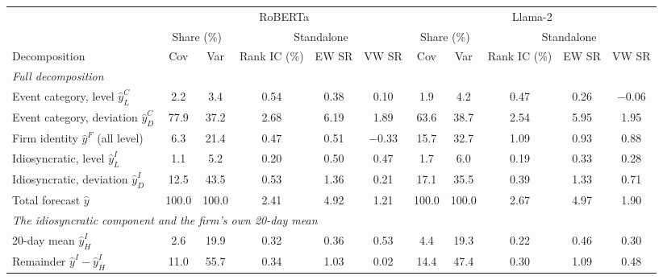 \begin{table}[htbp]
{\footnotesize
\begin{adjustbox}{max width=\linewidth, max totalheight=0.75\textheight}
\begin{tabular}{lcccccccccc}
\toprule
 & \multicolumn{5}{c}{RoBERTa} & \multicolumn{5}{c}{Llama-2} \\
\cmidrule(lr){2-6} \cmidrule(lr){7-11}
 & \multicolumn{2}{c}{Share (\%)} & \multicolumn{3}{c}{Standalone} & \multicolumn{2}{c}{Share (\%)} & \multicolumn{3}{c}{Standalone} \\
\cmidrule(lr){2-3} \cmidrule(lr){4-6} \cmidrule(lr){7-8} \cmidrule(lr){9-11}
Decomposition & Cov & Var & Rank IC (\%) & EW SR & VW SR & Cov & Var & Rank IC (\%) & EW SR & VW SR \\
\midrule
\multicolumn{11}{l}{\textit{Full decomposition}} \\
Event category, level $\hat y^C_L$ & \phantom{00}2.2 & \phantom{00}3.4 & 0.54 & 0.38 & \phantom{$-$}0.10 & \phantom{00}1.9 & \phantom{00}4.2 & 0.47 & 0.26 & $-$0.06 \\
Event category, deviation $\hat y^C_D$ & \phantom{0}77.9 & \phantom{0}37.2 & 2.68 & 6.19 & \phantom{$-$}1.89 & \phantom{0}63.6 & \phantom{0}38.7 & 2.54 & 5.95 & \phantom{$-$}1.95 \\
Firm identity $\hat y^F$ (all level) & \phantom{00}6.3 & \phantom{0}21.4 & 0.47 & 0.51 & $-$0.33 & \phantom{0}15.7 & \phantom{0}32.7 & 1.09 & 0.93 & \phantom{$-$}0.88 \\
Idiosyncratic, level $\hat y^I_L$ & \phantom{00}1.1 & \phantom{00}5.2 & 0.20 & 0.50 & \phantom{$-$}0.47 & \phantom{00}1.7 & \phantom{00}6.0 & 0.19 & 0.33 & \phantom{$-$}0.28 \\
Idiosyncratic, deviation $\hat y^I_D$ & \phantom{0}12.5 & \phantom{0}43.5 & 0.53 & 1.36 & \phantom{$-$}0.21 & \phantom{0}17.1 & \phantom{0}35.5 & 0.39 & 1.33 & \phantom{$-$}0.71 \\
Total forecast $\hat y$ & 100.0 & 100.0 & 2.41 & 4.92 & \phantom{$-$}1.21 & 100.0 & 100.0 & 2.67 & 4.97 & \phantom{$-$}1.90 \\
\midrule
\multicolumn{11}{l}{\textit{The idiosyncratic component and the firm's own 20-day mean}} \\
20-day mean $\hat y^I_H$ & \phantom{00}2.6 & \phantom{0}19.9 & 0.32 & 0.36 & \phantom{$-$}0.53 & \phantom{00}4.4 & \phantom{0}19.3 & 0.22 & 0.46 & \phantom{$-$}0.30 \\
Remainder $\hat y^I-\hat y^I_H$ & \phantom{0}11.0 & \phantom{0}55.7 & 0.34 & 1.03 & \phantom{$-$}0.02 & \phantom{0}14.4 & \phantom{0}47.4 & 0.30 & 1.09 & \phantom{$-$}0.48 \\
\bottomrule
\end{tabular}
\end{adjustbox}
}
\end{table}
